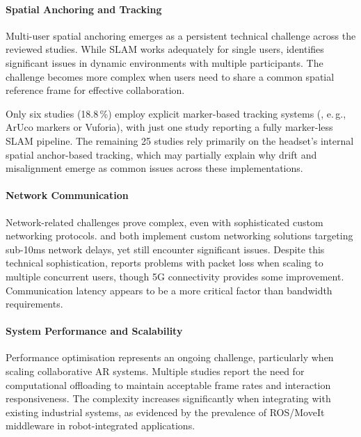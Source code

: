 \paragraph{Spatial Anchoring and Tracking}

Multi-user spatial anchoring emerges as a persistent technical challenge across the reviewed studies. While SLAM works adequately for single users, \cite{martins2024multiUser} identifies significant issues in dynamic environments with multiple participants. The challenge becomes more complex when users need to share a common spatial reference frame for effective collaboration.

Only six studies (18.8\,\%) employ explicit marker-based tracking systems (, e.\,g., ArUco markers or Vuforia), with just one study reporting a fully marker-less SLAM pipeline. The remaining 25 studies rely primarily on the headset's internal spatial anchor-based tracking, which may partially explain why drift and misalignment emerge as common issues across these implementations.

\paragraph{Network Communication}

Network-related challenges prove complex, even with sophisticated custom networking protocols. \cite{vidalBalea2020creating} and \cite{wang2022crossPlatform} both implement custom networking solutions targeting sub-10ms network delays, yet still encounter significant issues. Despite this technical sophistication, \cite{vidalBalea2020creating} reports problems with packet loss when scaling to multiple concurrent users, though 5G connectivity provides some improvement. Communication latency appears to be a more critical factor than bandwidth requirements\cite{wang2022crossPlatform}.

\paragraph{System Performance and Scalability}

Performance optimisation represents an ongoing challenge, particularly when scaling collaborative AR systems. Multiple studies report the need for computational offloading to maintain acceptable frame rates and interaction responsiveness\cite{stacchio2023annHoloTator,schmidt2022augmentedReality,gemito2023mixed}. The complexity increases significantly when integrating with existing industrial systems, as evidenced by the prevalence of ROS/MoveIt middleware in robot-integrated applications.

